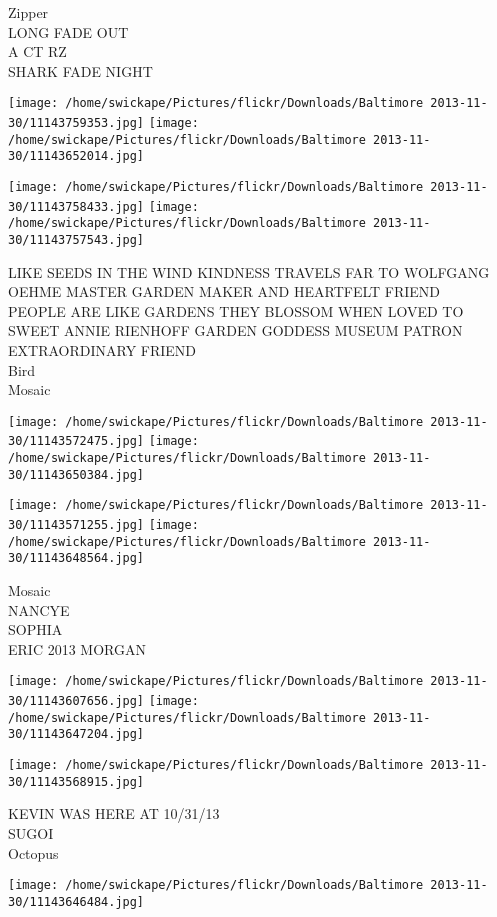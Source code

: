 \documentclass[10pt,letterpaper]{article}
\begin{document}
Zipper\\
LONG FADE OUT\\
A CT RZ\\
SHARK FADE NIGHT
\pagebreak

\texttt{[image: /home/swickape/Pictures/flickr/Downloads/Baltimore 2013-11-30/11143759353.jpg]}
\texttt{[image: /home/swickape/Pictures/flickr/Downloads/Baltimore 2013-11-30/11143652014.jpg]}

\texttt{[image: /home/swickape/Pictures/flickr/Downloads/Baltimore 2013-11-30/11143758433.jpg]}
\texttt{[image: /home/swickape/Pictures/flickr/Downloads/Baltimore 2013-11-30/11143757543.jpg]}

LIKE SEEDS IN THE WIND KINDNESS TRAVELS FAR TO WOLFGANG OEHME MASTER GARDEN MAKER AND HEARTFELT FRIEND\\
PEOPLE ARE LIKE GARDENS THEY BLOSSOM WHEN LOVED TO SWEET ANNIE RIENHOFF GARDEN GODDESS MUSEUM PATRON EXTRAORDINARY FRIEND\\
Bird\\
Mosaic
\pagebreak

\texttt{[image: /home/swickape/Pictures/flickr/Downloads/Baltimore 2013-11-30/11143572475.jpg]}
\texttt{[image: /home/swickape/Pictures/flickr/Downloads/Baltimore 2013-11-30/11143650384.jpg]}

\texttt{[image: /home/swickape/Pictures/flickr/Downloads/Baltimore 2013-11-30/11143571255.jpg]}
\texttt{[image: /home/swickape/Pictures/flickr/Downloads/Baltimore 2013-11-30/11143648564.jpg]}

Mosaic\\
NANCYE\\
SOPHIA\\
ERIC 2013 MORGAN
\pagebreak

\texttt{[image: /home/swickape/Pictures/flickr/Downloads/Baltimore 2013-11-30/11143607656.jpg]}
\texttt{[image: /home/swickape/Pictures/flickr/Downloads/Baltimore 2013-11-30/11143647204.jpg]}

\texttt{[image: /home/swickape/Pictures/flickr/Downloads/Baltimore 2013-11-30/11143568915.jpg]}

KEVIN WAS HERE AT 10/31/13\\
SUGOI\\
Octopus
\pagebreak

\texttt{[image: /home/swickape/Pictures/flickr/Downloads/Baltimore 2013-11-30/11143646484.jpg]}
\end{document}
